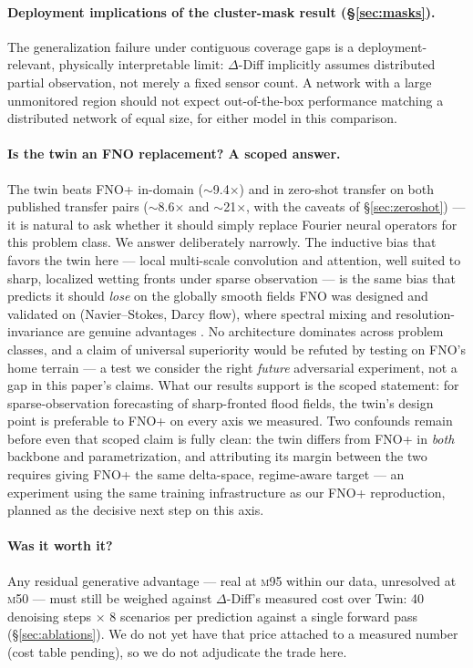 \documentclass[11pt]{article}
\newcommand{\ours}{\mbox{$\Delta$-Diff}}       %
\newcommand{\twin}{\mbox{Twin}}                 %
\newcommand{\mfifty}{\textsc{m50}}
\newcommand{\mninetyfive}{\textsc{m95}}
\begin{document}
\paragraph{Deployment implications of the cluster-mask result
(\S\ref{sec:masks}).} The generalization failure under contiguous
coverage gaps is a deployment-relevant, physically interpretable limit:
\ours{} implicitly assumes distributed partial observation, not merely a
fixed sensor count. A network with a large unmonitored region should not
expect out-of-the-box performance matching a distributed network of equal
size, for either model in this comparison.

\paragraph{Is the twin an FNO replacement? A scoped answer.} The twin
beats FNO+ in-domain ($\sim$9.4$\times$) and in zero-shot transfer on
both published transfer pairs ($\sim$8.6$\times$ and $\sim$21$\times$,
with the caveats of \S\ref{sec:zeroshot}) --- it is
natural to ask whether it should simply replace Fourier neural operators
for this problem class. We answer deliberately narrowly. The inductive
bias that favors the twin here --- local multi-scale convolution and
attention, well suited to sharp, localized wetting fronts under sparse
observation --- is the same bias that predicts it should \emph{lose} on
the globally smooth fields FNO was designed and validated on
(Navier--Stokes, Darcy flow), where spectral mixing and
resolution-invariance are genuine advantages \citep{li2021fno}. No
architecture dominates across problem classes, and a claim of universal
superiority would be refuted by testing on FNO's home terrain --- a test
we consider the right \emph{future} adversarial experiment, not a gap in
this paper's claims. What our results support is the scoped statement:
for sparse-observation forecasting of sharp-fronted flood fields, the
twin's design point is preferable to FNO+ on every axis we measured.
Two confounds remain before even that scoped claim is fully clean: the
twin differs from FNO+ in \emph{both} backbone and parametrization, and
attributing its margin between the two requires giving FNO+ the same
delta-space, regime-aware target --- an experiment using the same
training infrastructure as our FNO+ reproduction, planned as the
decisive next step on this axis.

\paragraph{Was it worth it?} Any residual generative advantage --- real
at \mninetyfive{} within our data, unresolved at \mfifty{} --- must still
be weighed against \ours{}'s measured cost over \twin{}: 40 denoising
steps $\times$ 8 scenarios per prediction against a single forward pass
(\S\ref{sec:ablations}). We do not yet have that price attached to a
measured number (cost table pending), so we do not adjudicate the trade
here.
\end{document}
